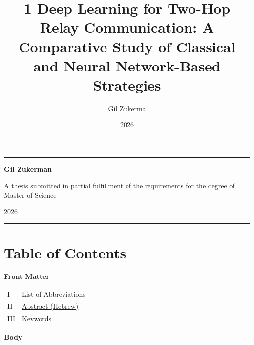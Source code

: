 \documentclass[
  english,
  12pt,
  12pt,
  a4paper,
  oneside]{report}
\title{1 Deep Learning for Two-Hop Relay Communication: A Comparative Study of Classical and Neural Network-Based Strategies}
\author{Gil Zukerma}
\date{2026}
\newcounter{none} %
\begin{document}
\maketitle

{
\setcounter{tocdepth}{3}
\tableofcontents
}
\listoffigures
\listoftables
{}
\begin{center}\rule{0.5\linewidth}{0.5pt}\end{center}

\textbf{Gil Zukerman}

A thesis submitted in partial fulfillment of the requirements for the degree of Master of Science

2026

\begin{center}\rule{0.5\linewidth}{0.5pt}\end{center}

\chapter*{Table of Contents}\label{sec:table-of-contents}

\textbf{Front Matter}

{\def\LTcaptype{none} %
\begin{longtable}[]{@{}ll@{}}
\toprule\noalign{}
\endhead
\bottomrule\noalign{}
\endlastfoot
I & List of Abbreviations \\
II & \hyperref[abstract-hebrew]{Abstract (Hebrew)} \\
III & Keywords \\
\end{longtable}
}

\textbf{Body}
\end{document}
